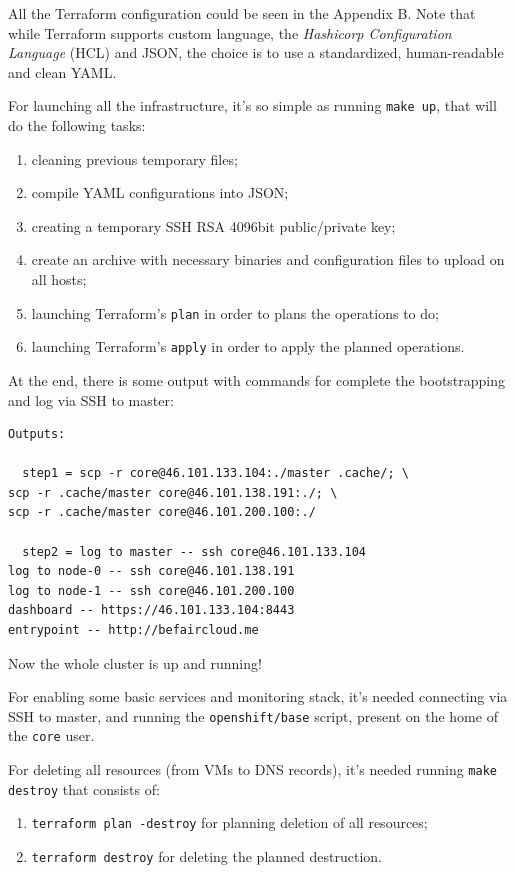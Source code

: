 All the Terraform configuration could be seen in the Appendix B.  Note that while Terraform supports custom language, the \textit{Hashicorp Configuration Language} (HCL) and JSON, the choice is to use a standardized, human-readable and clean YAML.

For launching all the infrastructure, it's so simple as running \texttt{make up}, that will do the following tasks:
\begin{enumerate}
\item cleaning previous temporary files;
\item compile YAML configurations into JSON;
\item creating a temporary SSH RSA 4096bit public/private key;
\item create an archive with necessary binaries and configuration files to upload on all hosts;
\item launching Terraform's \texttt{plan} in order to plans the operations to do;
\item launching Terraform's \texttt{apply} in order to apply the planned operations.
\end{enumerate}

At the end, there is some output with commands for complete the bootstrapping and log via SSH to master:

\begin{verbatim}
Outputs:

  step1 = scp -r core@46.101.133.104:./master .cache/; \
scp -r .cache/master core@46.101.138.191:./; \
scp -r .cache/master core@46.101.200.100:./

  step2 = log to master -- ssh core@46.101.133.104
log to node-0 -- ssh core@46.101.138.191
log to node-1 -- ssh core@46.101.200.100
dashboard -- https://46.101.133.104:8443
entrypoint -- http://befaircloud.me
\end{verbatim}

Now the whole cluster is up and running!

For enabling some basic services and monitoring stack, it's needed connecting via SSH to master, and running the \texttt{openshift/base} script, present on the home of the \texttt{core} user.

For deleting all resources (from VMs to DNS records), it's needed running \texttt{make destroy} that consists of:
\begin{enumerate}
\item \texttt{terraform plan -destroy} for planning deletion of all resources;
\item \texttt{terraform destroy} for deleting the planned destruction.
\end{enumerate}

